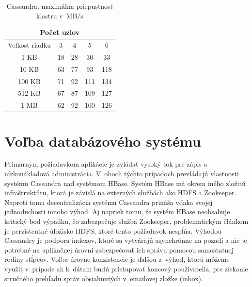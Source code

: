 \documentclass[11pt,twoside,a4paper]{book}
\begin{document}
\begin{table}[htp]
\begin{center}
\begin{tabular}{|c|c|c|c|c|}
\hline
\multicolumn{5}{|c|}{Počet uzlov}  \\
\hline Veľkosť riadku & 3 & 4 & 5 & 6\\ 
\hline
\hline 1 KB & 18 & 28 & 30 & 33\\ 
\hline 10 KB & 63 & 77 & 93 & 118 \\ 
\hline 100 KB & 71 & 92 & 111 & 134\\ 
\hline 512 KB & 67 & 87 & 109 & 127\\  
\hline 1 MB & 62 & 92 & 100 & 126\\ 
\hline
\end{tabular} 
\end{center}
\caption{Cassandra: maximálna priepustnosť klastru v~MB/s}
\label{tab:CPerf1}
\end{table}





\section{Voľba databázového systému}

Primárnym požiadavkom aplikácie je zvládať vysoký tok pre zápis a nízkonákladová administrácia. V~oboch týchto prípadoch prevládajú vlastnosti systému Cassandra nad systémom HBase. Systém HBase má okrem iného zložitú infraštruktúru, ktorá je závislá na externých službách ako HDFS a Zookeeper. Naproti tomu decentralizácia systému Cassandra prináša vďaka svojej jednoduchosti mnoho výhod. Aj napriek tomu, že systém HBase neobsahuje kritický bod výpadku, čo zabezpečuje služba Zookeeper, problematickým článkom je perzistentné úložisko HDFS, ktoré tento požiadavok nespĺňa. Výhodou Cassandry je podpora indexov, ktoré sa vytvárajú asynchrónne na pozadí a nie je potrebné na aplikačnej úrovni zabezpečovať ich správu pomocou samostatnej rodiny stĺpcov. Voľba úrovne konzistencie je ďalšou z~výhod, ktorú môžeme využiť v~prípade ak k~dátam budú pristupovať koncový použivatelia, pre získanie stručného prehľadu správ obsiahnutých v~emailovej zložke (inbox).
\end{document}
